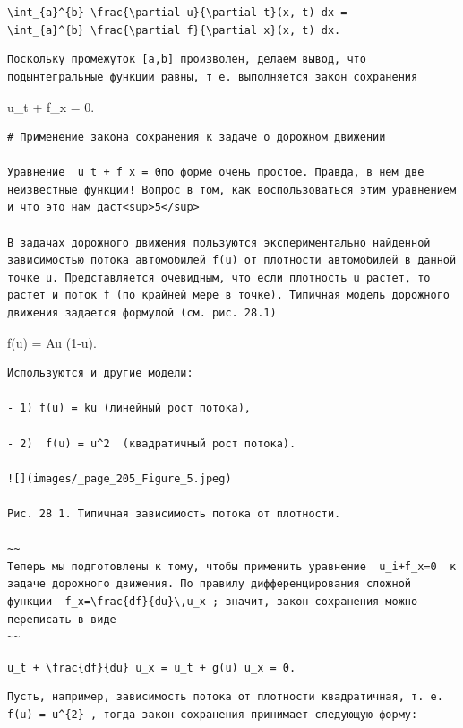 \documentclass[
  ukrainian,
]{article}
\begin{document}
\texttt{\textbackslash{}int\_\{a\}\^{}\{b\}\ \textbackslash{}frac\{\textbackslash{}partial\ u\}\{\textbackslash{}partial\ t\}(x,\ t)\ dx\ =\ -\textbackslash{}int\_\{a\}\^{}\{b\}\ \textbackslash{}frac\{\textbackslash{}partial\ f\}\{\textbackslash{}partial\ x\}(x,\ t)\ dx.}

\begin{verbatim}
Поскольку промежуток [a,b] произволен, делаем вывод, что подынтегральные функции равны, т е. выполняется закон сохранения
\end{verbatim}

u\_t + f\_x = 0.

\begin{verbatim}
# Применение закона сохранения к задаче о дорожном движении

Уравнение  u_t + f_x = 0по форме очень простое. Правда, в нем две неизвестные функции! Вопрос в том, как воспользоваться этим уравнением и что это нам даст<sup>5</sup>

В задачах дорожного движения пользуются экспериментально найденной зависимостью потока автомобилей f(u) от плотности автомобилей в данной точке u. Представляется очевидным, что если плотность u растет, то растет и поток f (по крайней мере в точке). Типичная модель дорожного движения задается формулой (см. рис. 28.1)
\end{verbatim}

f(u) = Au (1-u).

\begin{verbatim}
Используются и другие модели:

- 1) f(u) = ku (линейный рост потока),

- 2)  f(u) = u^2  (квадратичный рост потока).

![](images/_page_205_Figure_5.jpeg)

Рис. 28 1. Типичная зависимость потока от плотности.

~~
Теперь мы подготовлены к тому, чтобы применить уравнение  u_i+f_x=0  к задаче дорожного движения. По правилу дифференцирования сложной функции  f_x=\frac{df}{du}\,u_x ; значит, закон сохранения можно переписать в виде
~~
\end{verbatim}

\texttt{u\_t\ +\ \textbackslash{}frac\{df\}\{du\}\ u\_x\ =\ u\_t\ +\ g(u)\ u\_x\ =\ 0.}

\begin{verbatim}
Пусть, например, зависимость потока от плотности квадратичная, т. е.  f(u) = u^{2} , тогда закон сохранения принимает следующую форму:
\end{verbatim}
\end{document}
